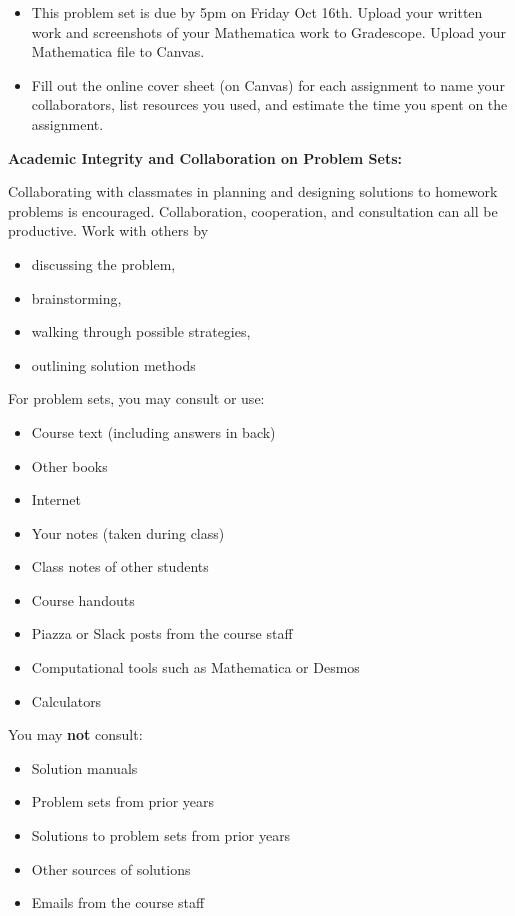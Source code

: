 \documentclass[12pt,letterpaper,noanswers]{exam}
\begin{document}
 \pdfpageheight 11in 
  \pdfpagewidth 8.5in
\begin{itemize}
\item This problem set is due by 5pm on Friday Oct 16th.  Upload your written work and screenshots of your Mathematica work to Gradescope.  Upload your Mathematica file to Canvas.
\item Fill out the online cover sheet (on Canvas) for each assignment to name your collaborators, list resources you used, and estimate the time you spent on the assignment.
\end{itemize}

\noindent\textbf{Academic Integrity and Collaboration on Problem Sets:}  

Collaborating with classmates in planning and designing solutions to homework problems is encouraged.  Collaboration, cooperation, and consultation can all be productive.  Work with others by 
\begin{multicols}{2}
\begin{itemize}
\itemsep-0.2em
    \item discussing the problem,
    \item brainstorming,
    \item walking through possible strategies,
    \item outlining solution methods
\end{itemize}   
\end{multicols}

\noindent For problem sets, you may consult or use:
\begin{multicols}{2}
\begin{itemize}
\itemsep-0.2em
    \item Course text (including answers in back)
    \item Other books
    \item Internet
    \item Your notes (taken during class)
    \item Class notes of other students
    \item Course handouts
    \item Piazza or Slack posts from the course staff
    \item Computational tools such as Mathematica or Desmos
    \item Calculators
\end{itemize}
\end{multicols}

\noindent You may \textbf{not} consult:
\begin{multicols}{2}
\begin{itemize}
\itemsep-0.2em
    \item Solution manuals
    \item Problem sets from prior years
    \item Solutions to problem sets from prior years
    \item Other sources of solutions
    \item Emails from the course staff
\end{itemize}
\end{multicols}
\end{document}
